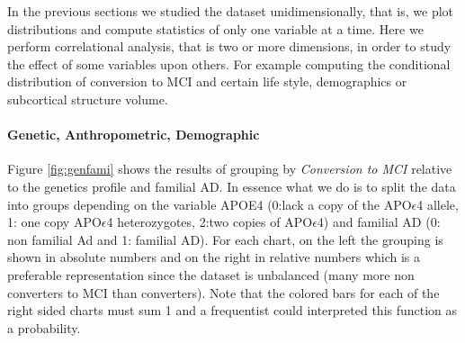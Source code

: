 \documentclass[11pt]{article}
\theoremstyle{definition}
\theoremstyle{remark}
\begin{document}
In the previous sections we studied the dataset unidimensionally, that is, we plot distributions and compute statistics of only one variable at a time. Here we perform correlational analysis, that is two or more dimensions, in order to study the effect of some variables upon others. For example computing the conditional distribution of conversion to MCI and certain life style, demographics or subcortical structure volume.

\paragraph*{Genetic, Anthropometric, Demographic}

Figure \ref{fig:genfami} shows the results of grouping by \emph{Conversion to MCI} relative to the genetics profile and familial AD. In essence what we do is to split the data into groups depending on the variable APOE4 (0:lack a copy of the APO$\epsilon$4 allele, 1: one copy APO$\epsilon$4 heterozygotes, 2:two copies of APO$\epsilon$4) and familial AD (0: non familial Ad and 1: familial AD).
For each chart, on the left the grouping is shown in absolute numbers and on the right in relative numbers which is a preferable representation since the dataset is unbalanced (many more non converters to MCI than converters). Note that the colored bars for each of the right sided charts must sum 1 and a frequentist could interpreted this function as a probability. 
\end{document}
